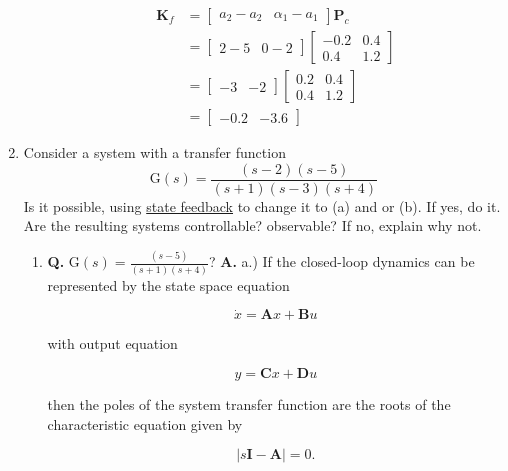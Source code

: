 \documentclass[main.tex]{subfiles}
\begin{document}
\begin{enumerate}
\begin{enumerate}
        $$
        \begin{aligned}
        \textbf{K}_f & =\left[\begin{array}{ll}
        a_2-a_2 & \alpha_1-a_1
        \end{array}\right] \textbf{P}_c \\
        & =\left[\begin{array}{ll}
        2-5 & 0-2
        \end{array}\right]\left[\begin{array}{cc}
        -0.2 & 0.4 \\
        0.4 & 1.2
        \end{array}\right] \\
        & =\left[\begin{array}{ll}
        -3 & -2
        \end{array}\right]\left[\begin{array}{ll}
        0.2 & 0.4 \\
        0.4 & 1.2
        \end{array}\right] \\
        & =\left[\begin{array}{ll}
        -0.2 & -3.6
        \end{array}\right]
        \end{aligned}
        $$
	\end{enumerate}
	
\item Consider a system with a transfer function 
$$\mathrm{G}(s)=\frac{(s-2)(s-5)}{(s+1)(s-3)(s+4)}$$
Is it possible, using \underline{state feedback} to change it to (a) and or (b). If yes, do it. Are the resulting systems controllable? observable? If no, explain why not.

    \begin{enumerate}
        \item \textbf{Q.} $\mathrm{G}(s)=\frac{(s-5)}{(s+1)(s+4)}$?
        \textbf{A.} a.) If the closed-loop dynamics can be represented by the state space equation 
        
        $$\dot{x} = \mathbf{A} x + \mathbf{B} u$$
        
        with output equation 
        
        $$y = \mathbf{C} x + \mathbf{D} u$$ 
        
        then the poles of the system transfer function are the roots of the characteristic equation given by 
        
        $$|s \mathbf{I}-\mathbf{A}|=0.$$ 
        

\end{enumerate}
\end{enumerate}
\end{document}
